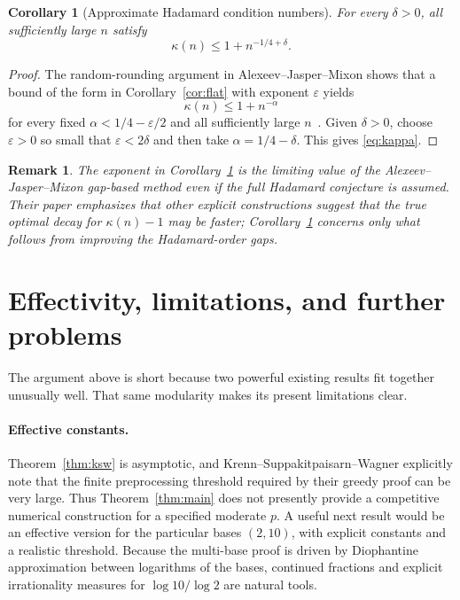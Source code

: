 \documentclass[11pt]{article}
\newtheorem{corollary}[theorem]{Corollary}
\newtheorem{remark}[theorem]{Remark}
\newcommand{\eps}{\varepsilon}
\begin{document}
\begin{corollary}[Approximate Hadamard condition numbers]\label{cor:kappa}
For every $\delta>0$, all sufficiently large $n$ satisfy
\begin{equation}\label{eq:kappa}
\kappa(n)\le1+n^{-1/4+\delta}.
\end{equation}
\end{corollary}

\begin{proof}
The random-rounding argument in Alexeev--Jasper--Mixon shows that a bound of the form in Corollary~\ref{cor:flat} with exponent $\eps$ yields
\[
\kappa(n)\le1+n^{-\alpha}
\]
for every fixed $\alpha<1/4-\eps/2$ and all sufficiently large $n$~\cite{Alexeev2025}.  Given $\delta>0$, choose $\eps>0$ so small that $\eps<2\delta$ and then take
$\alpha=1/4-\delta$.  This gives \eqref{eq:kappa}.
\end{proof}

\begin{remark}
The exponent in Corollary~\ref{cor:kappa} is the limiting value of the Alexeev--Jasper--Mixon gap-based method even if the full Hadamard conjecture is assumed.  Their paper emphasizes that other explicit constructions suggest that the true optimal decay for $\kappa(n)-1$ may be faster; Corollary~\ref{cor:kappa} concerns only what follows from improving the Hadamard-order gaps.
\end{remark}

\section{Effectivity, limitations, and further problems}
The argument above is short because two powerful existing results fit together unusually well.  That same modularity makes its present limitations clear.

\paragraph{Effective constants.}
Theorem~\ref{thm:ksw} is asymptotic, and Krenn--Suppakitpaisarn--Wagner explicitly note that the finite preprocessing threshold required by their greedy proof can be very large.  Thus Theorem~\ref{thm:main} does not presently provide a competitive numerical construction for a specified moderate $p$.  A useful next result would be an effective version for the particular bases $(2,10)$, with explicit constants and a realistic threshold.  Because the multi-base proof is driven by Diophantine approximation between logarithms of the bases, continued fractions and explicit irrationality measures for $\log 10/\log 2$ are natural tools.
\end{document}
